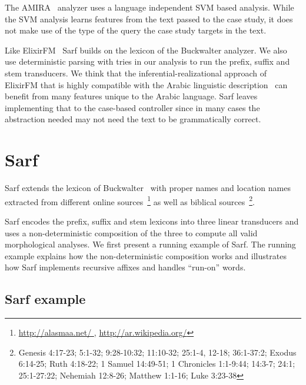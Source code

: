 \documentclass[11pt]{article}
\begin{document}
The AMIRA~\cite{Diab:07} analyzer uses 
a language independent SVM based analysis. 
While the SVM analysis learns features from the text passed to the case
study, it does not make use of the type of the query the 
case study targets in the text. 

Like ElixirFM~\cite{Otakar:07} Sarf builds on the lexicon
of the Buckwalter analyzer. 
We also use deterministic parsing with tries in our analysis 
to run the prefix, suffix and stem transducers. 
We think that the inferential-realizational approach 
of ElixirFM
that is highly compatible with the Arabic linguistic 
description~\cite{Badawi:04}
can benefit from many features unique to the Arabic language.
Sarf leaves implementing that to the case-based controller
since in many cases the abstraction needed may not need the 
text to be grammatically correct.

\section{Sarf}
\label{sec:sarf}

Sarf extends the lexicon of Buckwalter~ with 
proper names and location names extracted from different online 
sources~\footnote{\href{http://alasmaa.net/}{http://alasmaa.net/ }, 
\href{http://ar.wikipedia.org/}{http://ar.wikipedia.org/}}
as well as biblical sources~\footnote{Genesis 4:17-23; 5:1-32; 9:28-10:32; 11:10-32; 25:1-4, 12-18; 36:1-37:2; Exodus 6:14-25; Ruth 4:18-22; 1 Samuel 14:49-51; 1 Chronicles 1:1-9:44; 14:3-7; 24:1; 25:1-27:22; Nehemiah 12:8-26; Matthew 1:1-16; Luke 3:23-38}.

Sarf encodes the prefix, suffix and stem lexicons into 
three linear transducers and uses a non-deterministic composition
of the three to compute all valid morphological analyses.
We first present a running example of Sarf. 
The running example explains
how the non-deterministic composition works and 
illustrates how Sarf implements recursive affixes and
handles ``run-on'' words.

\subsection{Sarf example}
\label{sec:example}

\transfalse
\begin{figure*}[tb]
\end{figure*}
\transtrue
\end{document}
